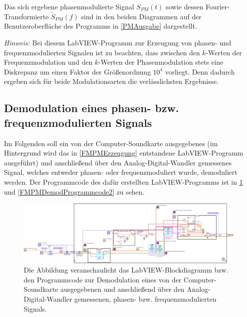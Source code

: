 \documentclass[
a4paper,
12pt,
pagesize,
ngerman
]{scrartcl}
\begin{document}
	\noindent Das sich ergebene phasenmodulierte Signal $S_{PM}(t)$ sowie dessen Fourier-Transformierte $\tilde{S}_{PM}(f)$ sind in den beiden Diagrammen auf der Benutzeroberfläche des Programms in \cref{PMAusgabe} dargestellt.
	
	\emph{Hinweis:} Bei diesem LabVIEW-Programm zur Erzeugung von phasen- und frequenzmodulierten Signalen ist zu beachten, dass zwischen den $k$-Werten der Frequenzmodulation und den $k$-Werten der Phasenmodulation stets eine Diskrepanz um einen Faktor der Größenordnung $10^4$ vorliegt.
	Denn dadurch ergeben sich für beide Modulationsarten die verlässlichsten Ergebnisse.
		
	
	
		
	\subsection{Demodulation eines phasen- bzw. frequenzmodulierten Signals} \label{FMPMDemodulation} %
	
	Im Folgenden soll ein von der Computer-Soundkarte ausgegebenes (im Hintergrund wird das in \cref{FMPMErzeugung} entstandene LabVIEW-Programm ausgeführt) und anschließend über den Analog-Digital-Wandler gemessenes Signal, welches entweder phasen- oder frequenzmoduliert wurde, demoduliert werden. 
	Der Programmcode des dafür erstellten LabVIEW-Programms ist in \cref{FMPMDemodProgrammcode1} und \cref{FMPMDemodProgrammcode2} zu sehen.
	
	\begin{figure}[H]
		\centering
		\includegraphics[width=1.0\textwidth]{EIRE2018Dateien/Tag4/OsziFMPM-Demod/FM/OsziPlusFMPMd}
		\caption{Die Abbildung veranschaulicht das LabVIEW-Blockdiagramm bzw. den Programmcode zur Demodulation eines von der Computer-Soundkarte ausgegebenen und anschließend über den Analog-Digital-Wandler gemessenen, phasen- bzw. frequenzmodulierten Signals.}
		\label{FMPMDemodProgrammcode1}
	\end{figure}
	
\end{document}
